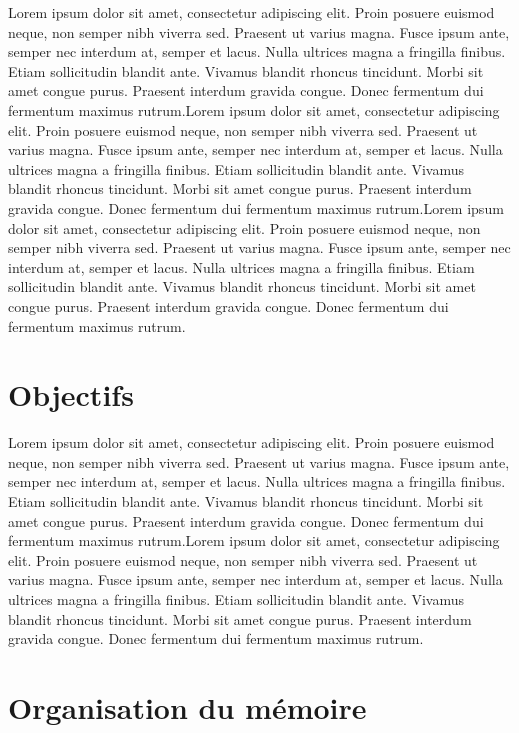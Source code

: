 Lorem ipsum dolor sit amet, consectetur adipiscing elit. Proin posuere euismod neque, non semper nibh viverra sed. Praesent ut varius magna. Fusce ipsum ante, semper nec interdum at, semper et lacus. Nulla ultrices magna a fringilla finibus. Etiam sollicitudin blandit ante. Vivamus blandit rhoncus tincidunt. Morbi sit amet congue purus. Praesent interdum gravida congue. Donec fermentum dui fermentum maximus rutrum.Lorem ipsum dolor sit amet, consectetur adipiscing elit. Proin posuere euismod neque, non semper nibh viverra sed. Praesent ut varius magna. Fusce ipsum ante, semper nec interdum at, semper et lacus. Nulla ultrices magna a fringilla finibus. Etiam sollicitudin blandit ante. Vivamus blandit rhoncus tincidunt. Morbi sit amet congue purus. Praesent interdum gravida congue. Donec fermentum dui fermentum maximus rutrum.Lorem ipsum dolor sit amet, consectetur adipiscing elit. Proin posuere euismod neque, non semper nibh viverra sed. Praesent ut varius magna. Fusce ipsum ante, semper nec interdum at, semper et lacus. Nulla ultrices magna a fringilla finibus. Etiam sollicitudin blandit ante. Vivamus blandit rhoncus tincidunt. Morbi sit amet congue purus. Praesent interdum gravida congue. Donec fermentum dui fermentum maximus rutrum.

\section*{Objectifs}

Lorem ipsum dolor sit amet, consectetur adipiscing elit. Proin posuere euismod neque, non semper nibh viverra sed. Praesent ut varius magna. Fusce ipsum ante, semper nec interdum at, semper et lacus. Nulla ultrices magna a fringilla finibus. Etiam sollicitudin blandit ante. Vivamus blandit rhoncus tincidunt. Morbi sit amet congue purus. Praesent interdum gravida congue. Donec fermentum dui fermentum maximus rutrum.Lorem ipsum dolor sit amet, consectetur adipiscing elit. Proin posuere euismod neque, non semper nibh viverra sed. Praesent ut varius magna. Fusce ipsum ante, semper nec interdum at, semper et lacus. Nulla ultrices magna a fringilla finibus. Etiam sollicitudin blandit ante. Vivamus blandit rhoncus tincidunt. Morbi sit amet congue purus. Praesent interdum gravida congue. Donec fermentum dui fermentum maximus rutrum.

\section*{Organisation du mémoire}

